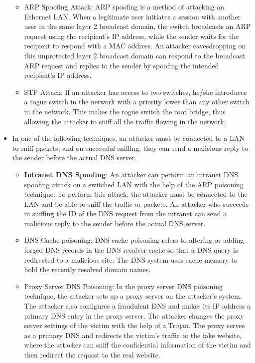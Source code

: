 \begin{itemize}
\begin{itemize}
        \item ARP Spoofing Attack: ARP spoofing is a method of attacking an Ethernet LAN. When a legitimate user initiates a session with another user in the same layer 2 broadcast domain, the switch broadcasts an ARP request using the recipient's IP address, while the sender waits for the recipient to respond with a MAC address. An attacker eavesdropping on this unprotected layer 2 broadcast domain can respond to the broadcast ARP request and replies to the sender by spoofing the intended recipient's IP address.
        \item STP Attack: If an attacker has access to two switches, he/she introduces a rogue switch in the network with a priority lower than any other switch in the network. This makes the rogue switch the root bridge, thus allowing the attacker to sniff all the traffic flowing in the network.
    \end{itemize}
    \item In one of the following techniques, an attacker must be connected to a LAN to sniff packets, and on successful sniffing, they can send a malicious reply to the sender before the actual DNS server.
    \begin{itemize}
        \item \textbf{Intranet DNS Spoofing}: An attacker can perform an intranet DNS spoofing attack on a switched LAN with the help of the ARP poisoning technique. To perform this attack, the attacker must be connected to the LAN and be able to sniff the traffic or packets. An attacker who succeeds in sniffing the ID of the DNS request from the intranet can send a malicious reply to the sender before the actual DNS server.
        \item  DNS Cache poisoning: DNS cache poisoning refers to altering or adding forged DNS records in the DNS resolver cache so that a DNS query is redirected to a malicious site. The DNS system uses cache memory to hold the recently resolved domain names.
        \item Proxy Server DNS Poisoning: In the proxy server DNS poisoning technique, the attacker sets up a proxy server on the attacker's system. The attacker also configures a fraudulent DNS and makes its IP address a primary DNS entry in the proxy server. The attacker changes the proxy server settings of the victim with the help of a Trojan. The proxy serves as a primary DNS and redirects the victim's traffic to the fake website, where the attacker can sniff the confidential information of the victim and then redirect the request to the real website.

\end{itemize}
\end{itemize}
